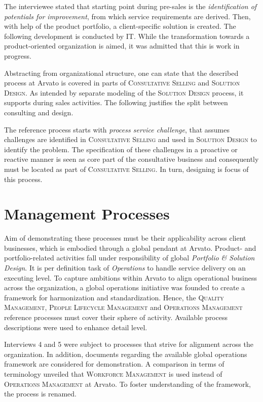 	The interviewee stated that starting point during pre-sales is the \textit{identification of potentials for improvement}, from which service requirements are derived. Then, with help of the product portfolio, a client-specific solution is created. The following development is conducted by IT. While the transformation towards a product-oriented organization is aimed, it was admitted that this is work in progress. 
	
	Abstracting from organizational structure, one can state that the described process at Arvato is covered in parts of \textsc{Consultative Selling} and \textsc{Solution Design}. As intended by separate modeling of the \textsc{Solution Design} process, it supports during sales activities. The following justifies the split between consulting and design. 
	
	The reference process starts with \textit{process service challenge}, that assumes challenges are identified in \textsc{Consultative Selling} and used in \textsc{Solution Design} to identify the problem. The specification of these challenges in a proactive or reactive manner is seen as core part of the consultative business and consequently must be located as part of \textsc{Consultative Selling}. In turn, designing is focus of this process. 
	
	\section{Management Processes}
	Aim of demonstrating these processes must be their applicability across client businesses, which is embodied through a global pendant at Arvato. Product- and portfolio-related activities fall under responsibility of global \textit{Portfolio \& Solution Design}. It is per definition task of \textit{Operations} to handle service delivery on an executing level. To capture ambitions within Arvato to align operational business across the organization, a global operations initiative was founded to create a framework for harmonization and standardization. Hence, the \textsc{Quality Management}, \textsc{People Lifecycle Management} and \textsc{Operations Management} reference processes must cover their sphere of activity. Available process descriptions were used to enhance detail level. 
	
	Interviews 4 and 5 were subject to processes that strive for alignment across the organization. In addition, documents regarding the available global operations framework are considered for demonstration. A comparison in terms of terminology unveiled that \textsc{Workforce Management} is used instead of \textsc{Operations Management} at Arvato. To foster understanding of the framework, the process is renamed.
	
